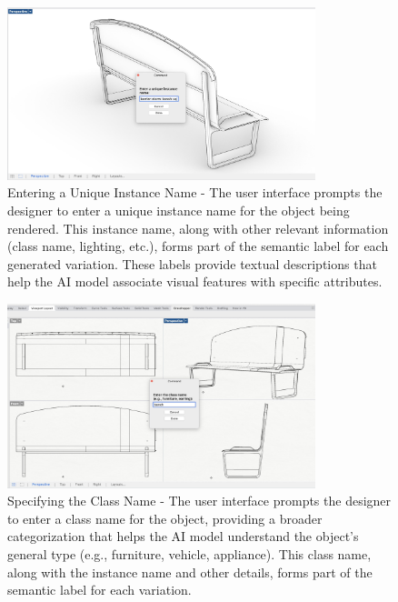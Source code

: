 \documentclass[12pt]{article}
\begin{document}
\begin{figure}[h]
    \centering
    \includegraphics[width=0.8\textwidth]{figures/figure-process-instance-name-barrier-1up-xy-monochrome.jpg}
    \caption{Entering a Unique Instance Name - The user interface prompts the designer to enter a unique instance name for the object being rendered. This instance name, along with other relevant information (class name, lighting, etc.), forms part of the semantic label for each generated variation. These labels provide textual descriptions that help the AI model associate visual features with specific attributes.}
    \label{fig:instance_name_input}
\end{figure}

\begin{figure}[h]
    \centering
    \includegraphics[width=0.8\textwidth]{figures/figure-process-class-name-bench-4up-bw.jpg}
    \caption{Specifying the Class Name - The user interface prompts the designer to enter a class name for the object, providing a broader categorization that helps the AI model understand the object's general type (e.g., furniture, vehicle, appliance). This class name, along with the instance name and other details, forms part of the semantic label for each variation.}
    \label{fig:class_name_input}
\end{figure}
\end{document}
